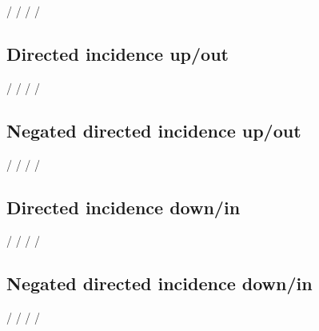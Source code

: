 \documentclass{article}
\begin{document}
{\GTStestTextII{\GTSnI/}{\GTSnIR/}

\GTStestTextII{\GTSxi[n]}{\GTSxi[n,r]}


\GTStestEqualTextsII{\GTSnI/}{\GTSnIR/}%
{\GTSnegatedIncidence/}%
{\GTSnegatedIncidenceRelation/}
\GTStestEqualTextsII{\GTSnI/}{\GTSnIR/}%
{\GTSnegInc/}%
{\GTSnegIncRel/}

\subsection{Directed incidence up/out}

\GTStestTextII{\GTSoI/}{\GTSoIR/}

\GTStestTextII{\GTSxi[o]}{\GTSxi[o,r]}


\GTStestEqualTextsII{\GTSoI/}{\GTSoIR/}%
{\GTSoutIncidence/}%
{\GTSoutIncidenceRelation/}
\GTStestEqualTextsII{\GTSoI/}{\GTSoIR/}%
{\GTSoutInc/}%
{\GTSoutIncRel/}

\subsection{Negated directed incidence up/out}

\GTStestTextII{\GTSnOI/}{\GTSnOIR/}



\GTStestEqualTextsII{\GTSnOI/}{\GTSnOIR/}%
{\GTSnegatedOutIncidence/}%
{\GTSnegatedOutIncidenceRelation/}
\GTStestEqualTextsII{\GTSnOI/}{\GTSnOIR/}%
{\GTSnegOutInc/}%
{\GTSnegOutIncRel/}

\subsection{Directed incidence down/in}

\GTStestTextII{\GTSiI/}{\GTSiIR/}

\GTStestTextII{\GTSxi[i]}{\GTSxi[i,r]}


\GTStestEqualTextsII{\GTSiI/}{\GTSiIR/}%
{\GTSinIncidence/}%
{\GTSinIncidenceRelation/}
\GTStestEqualTextsII{\GTSiI/}{\GTSiIR/}%
{\GTSinInc/}%
{\GTSinIncRel/}

\subsection{Negated directed incidence down/in}

\GTStestTextII{\GTSnII/}{\GTSnIIR/}

\GTStestTextII{\GTSxi[n,i]}{\GTSxi[n,i,r]}


\GTStestEqualTextsII{\GTSnII/}{\GTSnIIR/}%
{\GTSnegatedInIncidence/}%
{\GTSnegatedInIncidenceRelation/}
\GTStestEqualTextsII{\GTSnII/}{\GTSnIIR/}%
{\GTSnegInInc/}%
{\GTSnegInIncRel/}
}
\end{document}
